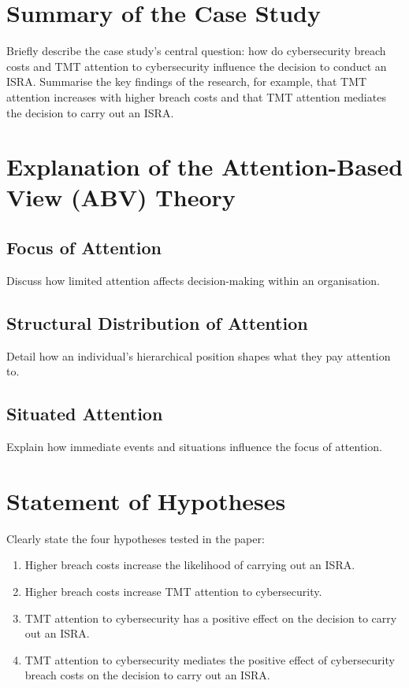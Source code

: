 \section{Summary of the Case Study}
Briefly describe the case study's central question: how do cybersecurity breach costs and TMT attention to cybersecurity influence the decision to conduct an ISRA. Summarise the key findings of the research, for example, that TMT attention increases with higher breach costs and that TMT attention mediates the decision to carry out an ISRA.

\section{Explanation of the Attention-Based View (ABV) Theory}
\subsection{Focus of Attention}
Discuss how limited attention affects decision-making within an organisation.
\subsection{Structural Distribution of Attention}
Detail how an individual's hierarchical position shapes what they pay attention to.
\subsection{Situated Attention}
Explain how immediate events and situations influence the focus of attention.

\section{Statement of Hypotheses}
Clearly state the four hypotheses tested in the paper:
\begin{enumerate}
    \item Higher breach costs increase the likelihood of carrying out an ISRA.
    \item Higher breach costs increase TMT attention to cybersecurity.
    \item TMT attention to cybersecurity has a positive effect on the decision to carry out an ISRA.
    \item TMT attention to cybersecurity mediates the positive effect of cybersecurity breach costs on the decision to carry out an ISRA.
\end{enumerate}

